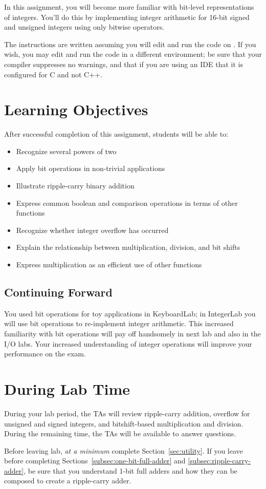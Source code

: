 In this assignment, you will become more familiar with bit-level representations of integers.
You'll do this by implementing integer arithmetic for 16-bit signed and unsigned integers using only bitwise operators.

The instructions are written assuming you will edit and run the code on \runtimeenvironment.
If you wish, you may edit and run the code in a different environment;
be sure that your compiler suppresses no warnings, and that if you are using an IDE that it is configured for C and not C++.

\section*{Learning Objectives}

After successful completion of this assignment, students will be able to:
\begin{itemize}
    \item Recognize several powers of two
    \item Apply bit operations in non-trivial applications
    \item Illustrate ripple-carry binary addition
    \item Express common boolean and comparison operations in terms of other functions
    \item Recognize whether integer overflow has occurred
    \item Explain the relationship between multiplication, division, and bit shifts
    \item Express multiplication as an efficient use of other functions
\end{itemize}

\subsection*{Continuing Forward}

You used bit operations for toy applications in KeyboardLab;
in IntegerLab you will use bit operations to re-implement integer arithmetic.
This increased familiarity with bit operations will pay off handsomely in next lab and also in the I/O labs.
Your increased understanding of integer operations will improve your performance on the exam.

\section*{During Lab Time}

During your lab period, the TAs will review ripple-carry addition, overflow for unsigned and signed integers, and bitshift-based multiplication and division.
During the remaining time, the TAs will be available to answer questions.

Before leaving lab, \textit{at a minimum} complete Section~\ref{sec:utility}.
If you leave before completing Sections~\ref{subsec:one-bit-full-adder} and \ref{subsec:ripple-carry-adder}, be sure that you understand 1-bit full adders and how they can be composed to create a ripple-carry adder.
